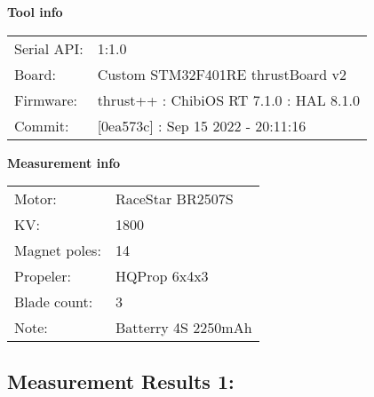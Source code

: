 \documentclass[10pt]{article}
\begin{document}
\noindent
{\large \bf Tool info}
\vspace{3mm}

\noindent
\begin{tabular}{ll}
Serial API:  & 1:1.0\\ 
Board:       & Custom STM32F401RE thrustBoard v2\\ 
Firmware:    & thrust++ : ChibiOS RT 7.1.0 : HAL 8.1.0\\ 
Commit:      & [0ea573c] : Sep 15 2022 - 20:11:16
\end{tabular}
\vspace{3mm}

\noindent
{\large \bf Measurement info}
\vspace{3mm}

\noindent
\begin{tabular}{ll}
Motor:        & RaceStar BR2507S\\ 
KV:           & 1800\\ 
Magnet poles: & 14\\ 
Propeler:     & HQProp 6x4x3\\ 
Blade count:  & 3\\ 
Note:         & Batterry 4S 2250mAh
\end{tabular}

\vspace{3mm}


\subsection*{\large \bf Measurement Results 1:}
\end{document}
